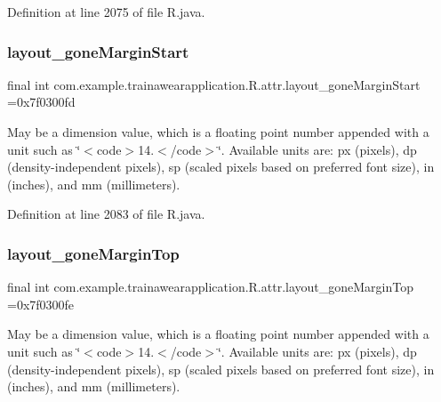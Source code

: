 Definition at line 2075 of file R.\+java.

\mbox{\label{classcom_1_1example_1_1trainawearapplication_1_1_r_1_1attr_ae038797bb9a948a8fcf94912949742d5}} 
\subsubsection{\texorpdfstring{layout\_goneMarginStart}{layout\_goneMarginStart}}
{\footnotesize\ttfamily final int com.\+example.\+trainawearapplication.\+R.\+attr.\+layout\+\_\+gone\+Margin\+Start =0x7f0300fd\hspace{0.3cm}{\ttfamily [static]}}

May be a dimension value, which is a floating point number appended with a unit such as \char`\"{}$<$code$>$14.\+5sp$<$/code$>$\char`\"{}. Available units are\+: px (pixels), dp (density-\/independent pixels), sp (scaled pixels based on preferred font size), in (inches), and mm (millimeters). 

Definition at line 2083 of file R.\+java.

\mbox{\label{classcom_1_1example_1_1trainawearapplication_1_1_r_1_1attr_a5dda0b6666992179df463c28f5c4e3f2}} 
\subsubsection{\texorpdfstring{layout\_goneMarginTop}{layout\_goneMarginTop}}
{\footnotesize\ttfamily final int com.\+example.\+trainawearapplication.\+R.\+attr.\+layout\+\_\+gone\+Margin\+Top =0x7f0300fe\hspace{0.3cm}{\ttfamily [static]}}

May be a dimension value, which is a floating point number appended with a unit such as \char`\"{}$<$code$>$14.\+5sp$<$/code$>$\char`\"{}. Available units are\+: px (pixels), dp (density-\/independent pixels), sp (scaled pixels based on preferred font size), in (inches), and mm (millimeters). 

